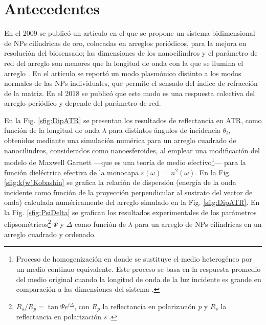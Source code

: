 \documentclass[letterpaper,11pt] {article}
\begin{document}
\section{Antecedentes}

En el 2009 se public\'o un art\'iculo \cite{kabashin2009plasmonic} en el que se propone un sistema bidimensional de NPs cilíndricas de oro, colocadas en arreglos periódicos, para la mejora en resoluci\'on  del biosensado; las dimensiones de los nanocilindros y el parámetro de red del arreglo son menores que la longitud de onda con la que se ilumina el arreglo \cite{kabashin2009plasmonic}.  En el artículo se reportó un modo plasmónico distinto a los modos normales de las NPs individuales, que permite el sensado del índice de refracción de la matriz.  En el 2018 se publicó que este modo es una respuesta colectiva del arreglo periódico \cite{danilov2018ultra} y depende del parámetro de red.  

 En la Fig.  \ref{sfig:DipATR} se presentan los resultados de reflectancia en ATR, como función de la longitud de onda $\lambda$ para distintos ángulos de incidencia $\theta_i$, obtenidos mediante una simulación numérica para un arreglo cuadrado de nanocilindros, considerados como nanoesferoides, al emplear una modificación del modelo de Maxwell Garnett \cite{atkinson2006anisotropic} ---que es una teoría de medio efectivo\footnote{Proceso de homogenización en donde se sustituye el medio heterogéneo por un medio continuo equivalente.  Este proceso se basa en la respuesta promedio del medio original cuando la longitud de onda de la luz incidente es grande en comparación a las dimensiones del sistema \cite{sihvola1999mixing}. }--- para la función dieléctrica efectiva de la monocapa $\varepsilon(\omega) = n^2 (\omega)$.   En la Fig.  \ref{sfig:k(w)Kobashin} se grafica la relación de dispersión  (energía de la onda incidente como función de la  proyección perpendicular al sustrato del vector de onda) calculada numéricamente del arreglo simulado en la Fig.  \ref{sfig:DipATR}.  En la Fig.  \ref{sfig:PsiDelta} se grafican los resultados experimentales de los parámetros elipsométricos\footnote{$R_s/R_p = \tan\Psi e^{i\Delta}$, con $R_p$ la reflectancia en polarización \emph{p} y $R_s$ la reflectancia en polarización \emph{s} \cite{danilov2018ultra}. } $\Psi$ y $\Delta$ como función de $\lambda$ para un arreglo de NPs cilíndricas en un arreglo cuadrado y ordenado. 
\end{document}
